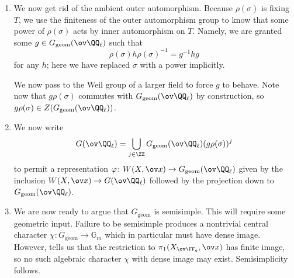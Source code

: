 \documentclass[../notes.tex]{subfiles}
\begin{document}
\begin{enumerate}
	\item We now get rid of the ambient outer automorphism. Because $\rho(\sigma)$ is fixing $T$, we use the finiteness of the outer automorphism group to know that some power of $\rho(\sigma)$ acts by inner automorphism on $T$. Namely, we are granted some $g\in G_{\mathrm{geom}}(\ov\QQ_\ell)$ such that
	\[\rho(\sigma)h\rho(\sigma)^{-1}=g^{-1}hg\]
	for any $h$; here we have replaced $\sigma$ with a power implicitly.

	We now pass to the Weil group of a larger field to force $g$ to behave. Note now that $g\rho(\sigma)$ commutes with $G_{\mathrm{geom}}(\ov\QQ_\ell)$ by construction, so $g\rho(\sigma)\in Z(G_{\mathrm{geom}}(\ov\QQ_\ell))$.

	\item We now write
	\[G(\ov\QQ_\ell)=\bigcup_{j\in\ZZ}G_{\mathrm{geom}}(\ov\QQ_\ell)(g\rho(\sigma))^j\]
	to permit a representation $\varphi\colon W(X,\ov x)\to G_{\mathrm{geom}}(\ov\QQ_\ell)$ given by the inclusion $W(X,\ov x)\to G(\ov\QQ_\ell)$ followed by the projection down to $G_{\mathrm{geom}}(\ov\QQ_\ell)$.

	\item We are now ready to argue that $G_{\mathrm{geom}}$ is semisimple. This will require some geometric input. Failure to be semisimple produces a nontrivial central character $\chi\colon G_{\mathrm{geom}}\to\mathbb G_m$ which in particular must have dense image. However,  tells us that the restriction to $\pi_1(X_{\ov\FF_q},\ov x)$ has finite image, so no such algebraic character $\chi$ with dense image may exist. Semisimplicity follows.
\end{enumerate}
\end{document}
